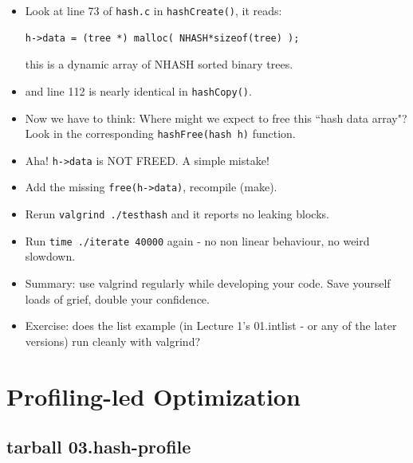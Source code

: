 \documentclass[aspectratio=169]{beamer}
\newcommand{\pitem}{\pause \item}
\begin{document}
\begin{frame}[fragile]
    \begin{itemize}
       \item
       Look at line 73 of \verb+hash.c+ in \verb+hashCreate()+, it reads:

\begin{verbatim}
h->data = (tree *) malloc( NHASH*sizeof(tree) );
\end{verbatim}

       this is a dynamic array of NHASH sorted binary trees.

       \item and line 112 is nearly identical in \verb+hashCopy()+.

  \pitem
  Now we have to think: Where might we expect to free this ``hash data array"?
  \pause
  Look in the corresponding \verb+hashFree(hash h)+ function.

  \pitem Aha!  \verb+h->data+ is NOT FREED.  A simple mistake!

  \item Add the missing \verb+free(h->data)+, recompile (make).
  \pitem Rerun \verb+valgrind ./testhash+ and it reports no leaking blocks.
  \item Run \verb+time ./iterate 40000+ again - no non linear behaviour,
  no weird slowdown.

    \pause
    \item
      Summary: \alert{use valgrind regularly while developing your code}.
      Save yourself loads of grief, double your confidence.
    \item
      Exercise: does the list example (in
      Lecture 1's \alert{01.intlist} - or any of the later versions)
      run cleanly with valgrind?
    \end{itemize}
\end{frame}

\section{Profiling-led Optimization}
\subsection{tarball 03.hash-profile}
\end{document}
